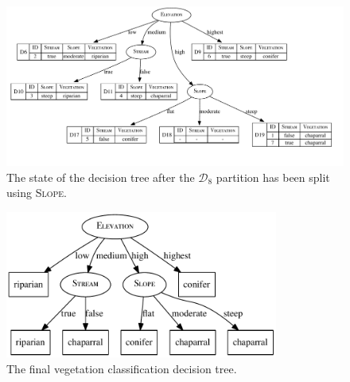 \documentclass[xcolor={table}]{beamer}
\newcommand{\featN}[1]{\textsc{#1}}
\begin{document}
 \begin{frame} 
\begin{figure}
\centerline{
	\includegraphics[width=\textwidth]{./images/ex-hand-ecology-dectree3_mod.pdf}
}
\caption{The state of the decision tree after the $\mathcal{D}_8$ partition has been split using \featN{Slope}.}
\label{fig:ex-hand-dectree3}
\end{figure}
\end{frame} 



 \begin{frame} 
\begin{figure}
\centerline{
	\includegraphics[width=0.8\textwidth]{./images/ex-hand-ecology-dectree4_mod.pdf}
}
\caption{The final vegetation classification decision tree.}
\label{fig:ex-hand-dectree4}
\end{figure}
\end{frame} 
\end{document}
